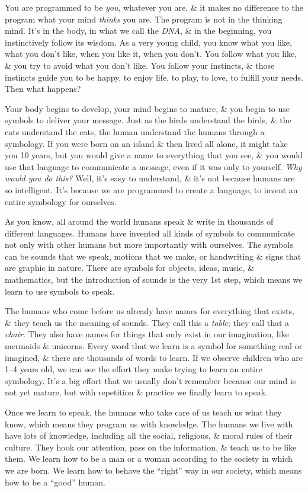 \documentclass{article}
\numberwithin{equation}{section}
\begin{document}
You are programmed to be \textit{you}, whatever you are, \& it makes no difference to the program what your mind \textit{thinks} you are. The program is not in the thinking mind. It's in the body, in what we call the \textit{DNA}, \& in the beginning, you instinctively follow its wisdom. As a very young child, you know what you like, what you don't like, when you like it, when you don't. You follow what you like, \& you try to avoid what you don't like. You follow your instincts, \& those instincts guide you to be happy, to enjoy life, to play, to love, to fulfill your needs. Then what happens?

Your body begins to develop, your mind begins to mature, \& you begin to use symbols to deliver your message. Just as the birds understand the birds, \& the cats understand the cats, the human understand the humans through a symbology. If you were born on an island \& then lived all alone, it might take you 10 years, but you would give a name to everything that you see, \& you would use that language to communicate a message, even if it was only to yourself. \textit{Why would you do this?} Well, it's easy to understand, \& it's not because humans are so intelligent. It's because we are programmed to create a language, to invent an entire symbology for ourselves.

As you know, all around the world humans speak \& write in thousands of different languages. Humans have invented all kinds of symbols to communicate not only with other humans but more importantly with ourselves. The symbols can be sounds that we speak, motions that we make, or handwriting \& signs that are graphic in nature. There are symbols for objects, ideas, music, \& mathematics, but the introduction of sounds is the very 1st step, which means we learn to use symbols to speak.

The humans who come before us already have names for everything that exists, \& they teach us the meaning of sounds. They call this a \textit{table}; they call that a \textit{chair}. They also have names for things that only exist in our imagination, like mermaids \& unicorns. Every word that we learn is a symbol for something real or imagined, \& there are thousands of words to learn. If we observe children who are 1--4 years old, we can see the effort they make trying to learn an entire symbology. It's a big effort that we usually don't remember because our mind is not yet mature, but with repetition \& practice we finally learn to speak.

Once we learn to speak, the humans who take care of us teach us what they know, which means they program us with knowledge. The humans we live with have lots of knowledge, including all the social, religious, \& moral rules of their culture. They hook our attention, pass on the information, \& teach us to be like them. We learn how to be a man or a woman according to the society in which we are born. We learn how to behave the ``right'' way in our society, which means how to be a ``good'' human.
\end{document}
